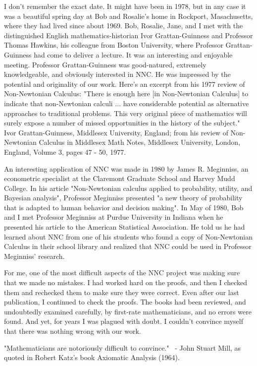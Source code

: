 \documentclass[12pt]{article}
\begin{document}
I don't remember the exact date. It might have been in 1978, but in any case it was a beautiful spring day at Bob and Rosalie's home in Rockport, Masachusetts, where they had lived since about 1969. Bob, Rosalie, Jane, and I met with the distinguished English mathematics-historian Ivor Grattan-Guinness and Professor Thomas Hawkins, his colleague from Boston University, where Professor Grattan-Guinness had come to deliver a lecture. It was an interesting and enjoyable meeting. Professor Grattan-Guinness was good-natured, extremely knowledgeable, and obviously interested in NNC. He was impressed by the potential and originality of our work. Here's an excerpt from his 1977 review of Non-Newtonian Calculus:
"There is enough here [in Non-Newtonian Calculus] to indicate that non-Newtonian calculi ... have considerable potential as alternative approaches to traditional problems. This very original piece of mathematics will surely expose a number of missed opportunities in the history of the subject."
Ivor Grattan-Guinness, Middlesex University, England; from his review of Non-Newtonian Calculus in Middlesex Math Notes, Middlesex University, London, England, Volume 3, pages 47 - 50, 1977.

An interesting application of NNC was made in 1980 by James R. Meginniss, an econometric specialist at the Claremont Graduate School and Harvey Mudd College. In his article "Non-Newtonian calculus applied to probability, utility, and Bayesian analysis", Professor Meginniss presented "a new theory of probability that is adapted to human behavior and decision making". In May of 1980, Bob and I met Professor Meginniss at Purdue University in Indiana when he presented his article to the American Statistical Association. He told us he had learned about NNC from one of his students who found a copy of Non-Newtonian Calculus in their school library and realized that NNC could be used in Professor Meginniss' research.

For me, one of the most difficult aspects of the NNC project was making sure that we made no mistakes. I had worked hard on the proofs, and then I checked them and rechecked them to make sure they were correct. Even after our last publication, I continued to check the proofs. The books had been reviewed, and undoubtedly examined carefully, by first-rate mathematicians, and no errors were found. And yet, for years I was plagued with doubt. I couldn't convince myself that there was nothing wrong with our work.

"Mathematicians are notoriously difficult to convince."
 - John Stuart Mill, as quoted in Robert Katz's book Axiomatic Analysis (1964).
\end{document}
